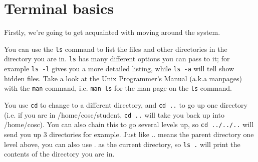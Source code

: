 \documentclass{article}
\begin{document}
\section{Terminal basics}
Firstly, we're going to get acquainted with moving around the system.

You can use the \texttt{ls} command to list the files and other directories in the directory you are in. \texttt{ls} has many different options you can pass to it; for example \texttt{ls -l} gives you a more detailed listing, while \texttt{ls -a} will tell show hidden files. Take a look at the Unix Programmer's Manual (a.k.a manpages) with the \texttt{man} command, i.e. \texttt{man ls} for the man page on the \texttt{ls} command.

You use \texttt{cd} to change to a different directory, and \texttt{cd ..} to go up one directory (i.e. if you are in /home/cosc/student, \texttt{cd ..} will take you back up into /home/cosc). You can also chain this to go several levels up, so \texttt{cd ../../..} will send you up 3 directories for example. Just like .. means the parent directory one level above, you can also use . as the current directory, so \texttt{ls .} will print the contents of the directory you are in. 
\end{document}
